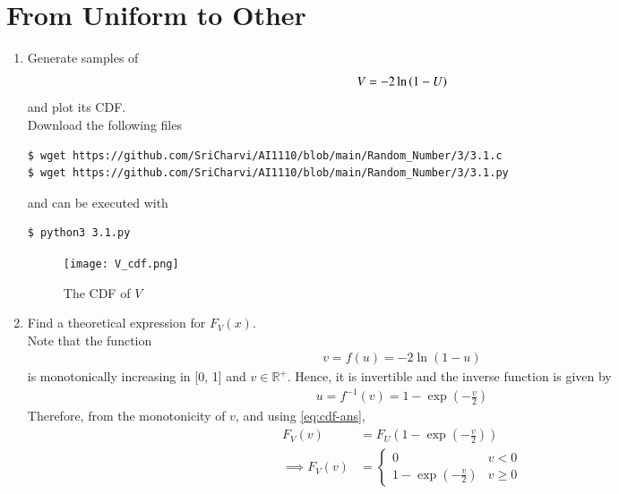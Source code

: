 \documentclass[journal,12pt,twocolumn]{IEEEtran}
\renewcommand\thesection{\arabic{section}}
\begin{document}
\section{From Uniform to Other}
\begin{enumerate}[label=\thesection.\arabic*
,ref=\thesection.\theenumi]
%
\item
Generate samples of 
%
\begin{equation}
V = -2\ln\left(1-U\right)
\end{equation}
%
and plot its CDF. \\
\solution
Download the following files
\begin{lstlisting}
$ wget https://github.com/SriCharvi/AI1110/blob/main/Random_Number/3/3.1.c
$ wget https://github.com/SriCharvi/AI1110/blob/main/Random_Number/3/3.1.py
\end{lstlisting}
and can be executed with
\begin{lstlisting}
$ python3 3.1.py
\end{lstlisting}
\begin{figure}
\centering
\texttt{[image: V\_cdf.png]}
\caption{The CDF of $V$}
\label{fig:exp_cdf}
\end{figure}
\item Find a theoretical expression for $F_V(x)$.\\
\solution
Note that the function 
		\begin{align}
			v = f(u) = -2\ln{(1 - u)}
		\end{align}
is monotonically increasing in [0, 1] and $v \in \mathbb{R^+}$. Hence, it is invertible and the inverse function is given by
		\begin{align}
			u = f^{-1}(v) = 1 - \exp{\left(-\frac{v}{2}\right)}
		\end{align}
		Therefore, from the monotonicity of $v$, and using \eqref{eq:cdf-ans},
		\begin{align}
			F_V(v) &= F_U\left(1 - \exp{\left(-\frac{v}{2}\right)}\right) \\
			\implies F_V(v) &= 
			\begin{cases}
				0 & v < 0 \\
				1 - \exp{\left(-\frac{v}{2}\right)} & v \geq 0
			\end{cases}
			\label{eq:f-v}
		\end{align}
%
\end{enumerate}
\end{document}
